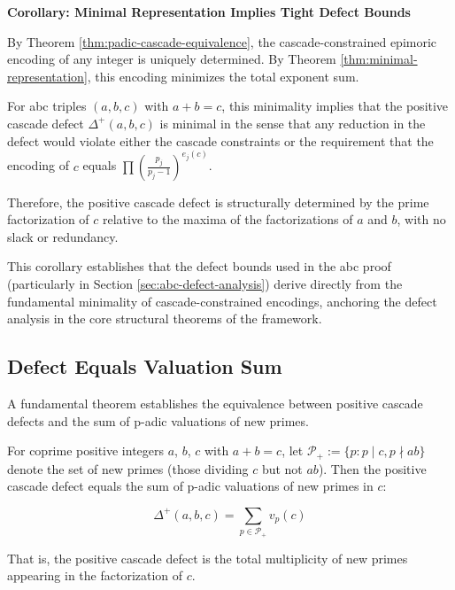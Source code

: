 \noindent \textbf{Corollary: Minimal Representation Implies Tight Defect Bounds}

\begin{corollary}
\label{cor:minimal-rep-tight-defects}

By Theorem \ref{thm:padic-cascade-equivalence}, the cascade-constrained epimoric encoding of any integer is uniquely determined. By Theorem \ref{thm:minimal-representation}, this encoding minimizes the total exponent sum.

For abc triples $(a, b, c)$ with $a + b = c$, this minimality implies that the positive cascade defect $\Delta^{+}(a,b,c)$ is minimal in the sense that any reduction in the defect would violate either the cascade constraints or the requirement that the encoding of $c$ equals $\prod \left(\frac{p_j}{p_j-1}\right)^{e_j(c)}$.

Therefore, the positive cascade defect is structurally determined by the prime factorization of $c$ relative to the maxima of the factorizations of $a$ and $b$, with no slack or redundancy.

\end{corollary}

This corollary establishes that the defect bounds used in the abc proof (particularly in Section \ref{sec:abc-defect-analysis}) derive directly from the fundamental minimality of cascade-constrained encodings, anchoring the defect analysis in the core structural theorems of the framework.

\subsection{Defect Equals Valuation Sum}
\label{subsec:defect-valuation-equivalence}

A fundamental theorem establishes the equivalence between positive cascade defects and the sum of p-adic valuations of new primes.

\begin{theorem}
\label{thm:defect-equals-valuation-sum}

For coprime positive integers $a$, $b$, $c$ with $a + b = c$, let $\mathcal{P}_+ := \{p : p \mid c, p \nmid ab\}$ denote the set of new primes (those dividing $c$ but not $ab$). Then the positive cascade defect equals the sum of p-adic valuations of new primes in $c$:

\begin{equation}
\label{eq:defect-valuation-equality}
\Delta^+(a,b,c) = \sum_{p \in \mathcal{P}_+} v_p(c)
\end{equation}

That is, the positive cascade defect is the total multiplicity of new primes appearing in the factorization of $c$.

\end{theorem}

